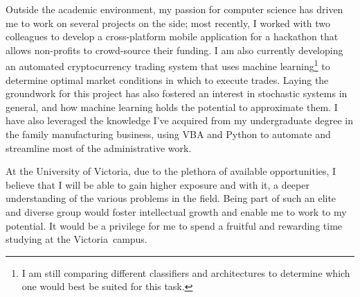 \documentclass[a4paper,11pt]{article}
\newcommand{\uni}{the University of Victoria}
\newcommand{\city}{Victoria}
\begin{document}

Outside the academic environment, my passion for computer science has driven me to work on several projects on the side; most recently, I worked with two colleagues to develop a cross-platform mobile application for a hackathon that allows non-profits to crowd-source their funding. I am also currently developing an automated cryptocurrency trading system that uses machine learning\footnote{I am still comparing different classifiers and architectures to determine which one would best be suited for this task.} to determine optimal market conditions in which to execute trades.  Laying the groundwork for this project has also fostered an interest in stochastic systems in general, and how machine learning holds the potential to approximate them. I have also leveraged the knowledge I've acquired from my undergraduate degree in the family manufacturing business, using VBA and Python to automate and streamline most of the administrative work.

At \uni, due to the plethora of available opportunities, I believe that I will be able to gain higher exposure and with it, a deeper understanding of the various problems in the field. Being part of such an elite and diverse group would foster intellectual growth and enable me to work to my potential. It would be a privilege for me to spend a fruitful and rewarding time studying at the \city\ campus.

\printbibliography
\end{document}
